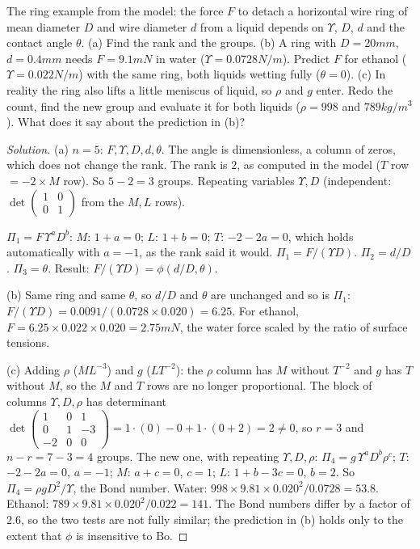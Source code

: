 \begin{example}
The ring example from the model: the force $F$ to detach a horizontal wire ring of mean diameter $D$ and wire diameter $d$ from a liquid depends on $\Upsilon$, $D$, $d$ and the contact angle $\theta$.
(a) Find the rank and the groups.
(b) A ring with $D = 20\unit{mm}$, $d = 0.4\unit{mm}$ needs $F = 9.1\unit{mN}$ in water ($\Upsilon = 0.0728\unit{N/m}$). Predict $F$ for ethanol ($\Upsilon = 0.022\unit{N/m}$) with the same ring, both liquids wetting fully ($\theta = 0$).
(c) In reality the ring also lifts a little meniscus of liquid, so $\rho$ and $g$ enter. Redo the count, find the new group and evaluate it for both liquids ($\rho = 998$ and $789\unit{kg/m^3}$). What does it say about the prediction in (b)?
\end{example}

\begin{proof}[Solution]
(a) $n = 5$: $F, \Upsilon, D, d, \theta$. The angle is dimensionless, a column of zeros, which does not change the rank. The rank is $2$, as computed in the model ($T$ row $= -2 \times M$ row). So $5 - 2 = 3$ groups. Repeating variables $\Upsilon, D$ (independent: $\det\begin{pmatrix}1&0\\0&1\end{pmatrix}$ from the $M, L$ rows).

$\Pi_1 = F\,\Upsilon^aD^b$: $M$: $1 + a = 0$; $L$: $1 + b = 0$; $T$: $-2 - 2a = 0$, which holds automatically with $a = -1$, as the rank said it would. $\Pi_1 = F/(\Upsilon D)$. $\Pi_2 = d/D$. $\Pi_3 = \theta$. Result: $F/(\Upsilon D) = \phi(d/D, \theta)$.

(b) Same ring and same $\theta$, so $d/D$ and $\theta$ are unchanged and so is $\Pi_1$: $F/(\Upsilon D) = 0.0091/(0.0728 \times 0.020) = 6.25$. For ethanol, $F = 6.25 \times 0.022 \times 0.020 = 2.75\unit{mN}$, the water force scaled by the ratio of surface tensions.

(c) Adding $\rho$ ($ML^{-3}$) and $g$ ($LT^{-2}$): the $\rho$ column has $M$ without $T^{-2}$ and $g$ has $T$ without $M$, so the $M$ and $T$ rows are no longer proportional. The block of columns $\Upsilon, D, \rho$ has determinant $\det\begin{pmatrix}1&0&1\\0&1&-3\\-2&0&0\end{pmatrix} = 1\cdot(0) - 0 + 1\cdot(0 + 2) = 2 \ne 0$, so $r = 3$ and $n - r = 7 - 3 = 4$ groups. The new one, with repeating $\Upsilon, D, \rho$: $\Pi_4 = g\,\Upsilon^aD^b\rho^c$; $T$: $-2 - 2a = 0$, $a = -1$; $M$: $a + c = 0$, $c = 1$; $L$: $1 + b - 3c = 0$, $b = 2$. So $\Pi_4 = \rho g D^2/\Upsilon$, the Bond number. Water: $998 \times 9.81 \times 0.020^2/0.0728 = 53.8$. Ethanol: $789 \times 9.81 \times 0.020^2/0.022 = 141$. The Bond numbers differ by a factor of $2.6$, so the two tests are not fully similar; the prediction in (b) holds only to the extent that $\phi$ is insensitive to $\mathrm{Bo}$.
\end{proof}

